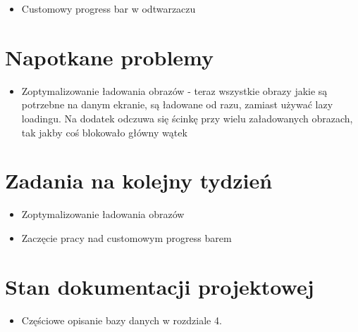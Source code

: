 \documentclass[12pt,a4paper]{mwart}
\begin{document}
\begin{itemize}
	\item Customowy progress bar w odtwarzaczu
\end{itemize}

\section{Napotkane problemy}

\begin{itemize}
	\item Zoptymalizowanie ładowania obrazów - teraz wszystkie obrazy jakie są potrzebne na danym ekranie, są ładowane od razu, zamiast używać lazy loadingu. Na dodatek odczuwa się ścinkę przy wielu załadowanych obrazach, tak jakby coś blokowało główny wątek
\end{itemize}

\section{Zadania na kolejny tydzień}

\begin{itemize}
	\item Zoptymalizowanie ładowania obrazów
	\item Zaczęcie pracy nad customowym progress barem
\end{itemize}

\section{Stan dokumentacji projektowej}
\begin{itemize}
	\item Częściowe opisanie bazy danych w rozdziale 4.
\end{itemize}
\end{document}
